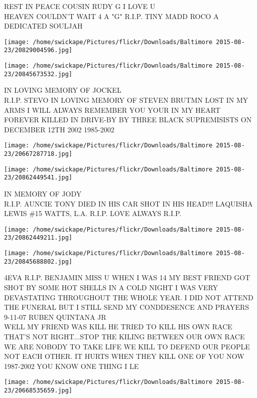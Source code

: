 \documentclass[10pt,letterpaper]{article}
\begin{document}
REST IN PEACE COUSIN RUDY G I LOVE U\\
HEAVEN COULDN'T WAIT 4 A "G" R.I.P. TINY MADD ROCO A DEDICATED SOULJAH
\pagebreak

\texttt{[image: /home/swickape/Pictures/flickr/Downloads/Baltimore 2015-08-23/20829004596.jpg]}

\vspace{0.25in}
\texttt{[image: /home/swickape/Pictures/flickr/Downloads/Baltimore 2015-08-23/20845673532.jpg]}

IN LOVING MEMORY OF JOCKEL\\
R.I.P. STEVO IN LOVING MEMORY OF STEVEN BRUTMN LOST IN MY ARMS I WILL ALWAYS REMEMBER YOU YOUR IN MY HEART FOREVER KILLED IN DRIVE{-}BY BY THREE BLACK SUPREMISISTS ON DECEMBER 12TH 2002 1985{-}2002
\pagebreak

\texttt{[image: /home/swickape/Pictures/flickr/Downloads/Baltimore 2015-08-23/20667287718.jpg]}

\vspace{0.25in}
\texttt{[image: /home/swickape/Pictures/flickr/Downloads/Baltimore 2015-08-23/20862449541.jpg]}

IN MEMORY OF JODY\\
R.I.P. AUNCIE TONY DIED IN HIS CAR SHOT IN HIS HEAD!!! LAQUISHA LEWIS \#15 WATTS, L.A. R.I.P. LOVE ALWAYS R.I.P.
\pagebreak

\texttt{[image: /home/swickape/Pictures/flickr/Downloads/Baltimore 2015-08-23/20862449211.jpg]}

\vspace{0.25in}
\texttt{[image: /home/swickape/Pictures/flickr/Downloads/Baltimore 2015-08-23/20845688802.jpg]}

4EVA R.I.P. BENJAMIN MISS U WHEN I WAS 14 MY BEST FRIEND GOT SHOT BY SOME HOT SHELLS IN A COLD NIGHT I WAS VERY DEVASTATING THROUGHOUT THE WHOLE YEAR.  I DID NOT ATTEND THE FUNERAL BUT I STILL SEND MY CONDDESENCE AND PRAYERS 9{-}11{-}07 RUBEN QUINTANA JR\\
WELL MY FRIEND WAS KILL HE TRIED TO KILL HIS OWN RACE THAT'S NOT RIGHT...STOP THE KILING BETWEEN OUR OWN RACE WE ARE NOBODY TO TAKE LIFE WE KILL TO DEFEND OUR PEOPLE NOT EACH OTHER.  IT HURTS WHEN THEY KILL ONE OF YOU NOW 1987{-}2002 YOU KNOW ONE THING I LE
\pagebreak

\texttt{[image: /home/swickape/Pictures/flickr/Downloads/Baltimore 2015-08-23/20668535659.jpg]}
\end{document}
